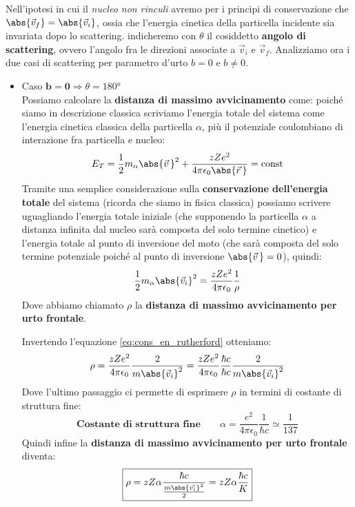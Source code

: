 Nell'ipotesi in cui il \textit{nucleo non rinculi} avremo per i principi di
conservazione che $\abs{\vec{v}_f} = \abs{\vec{v}_i}$, ossia che l'energia
cinetica della particella incidente sia invariata dopo lo scattering.
indicheremo con $\theta$ il cosiddetto \textbf{angolo di scattering}, ovvero
l'angolo fra le direzioni associate a $\vec{v}_{i}$ e $\vec{v}_{f}$.
Analizziamo ora i due casi di scattering per parametro d'urto $b=0$ e $b\neq0$.
\begin{itemize}
  \item Caso $\boxed{\boldsymbol{b = 0} \Rightarrow \theta =
    180\si{\degree}}$\\
    Possiamo calcolare la \textbf{distanza di massimo avvicinamento} come:
    poiché siamo in descrizione classica scriviamo l'energia totale del sistema
    come l'energia cinetica classica della particella $\alpha$, più il
    potenziale coulombiano di interazione fra particella e nucleo:
    \begin{equation}
      E_T = \frac{1}{2}m_\alpha \abs{\vec{v}\,}^2 + \frac{zZe^2}{4\pi\epsilon_0
      \abs{\vec{r}\,}} = \text{const}
    \end{equation}
    Tramite una semplice considerazione sulla \textbf{conservazione
    dell'energia totale} del sistema (ricorda che siamo in fisica classica)
    possiamo scrivere uguagliando l'energia totale iniziale (che supponendo la
    particella $\alpha$ a distanza infinita dal nucleo sarà composta del solo
    termine cinetico) e l'energia totale al punto di inversione del moto (che
    sarà composta del solo termine potenziale poiché al punto di inversione
    $\abs{\vec{v}\,} = 0$),
    quindi:
    \begin{equation}
      \frac{1}{2}m_\alpha \abs{\vec{v}_i}^2 =
      \frac{zZe^2}{4\pi\epsilon_0}\frac{1}{\rho}
      \label{eq:cons_en_rutherford}
    \end{equation}
    Dove abbiamo chiamato $\rho$ la \textbf{distanza di massimo
    avvicinamento per urto frontale}.

    Invertendo l'equazione \ref{eq:cons_en_rutherford} otteniamo:
    \begin{equation}
      \rho = \frac{zZe^2}{4\pi\epsilon_0}\frac{2}{m\abs{\vec{v}_i}^2} =
      \frac{zZe^2}{4\pi\epsilon_0}\frac{\hbar c}{\hbar
      c}\frac{2}{m\abs{\vec{v}_i}^2}
    \end{equation}
    Dove l'ultimo passaggio ci permette di esprimere $\rho$ in termini di
    costante di struttura fine:
    \begin{equation}
      \textbf{Costante di struttura fine}
      \qquad
      \boxed{
        \alpha = \frac{e^2}{4\pi\epsilon_0}\frac{1}{\hbar c} \simeq
        \frac{1}{137}
      }
    \end{equation}
    Quindi infine la \textbf{distanza di massimo avvicinamento per urto
    frontale} diventa:
    \begin{equation}
      \boxed{
        \rho = zZ\alpha\frac{\hbar c}{\frac{m\abs{\vec{v_i}}^2}{2}} =
        zZ\alpha\frac{\hbar c}{K}
      }
      \label{eq:dist_max_avvicinamento}
    \end{equation}


\end{itemize}
